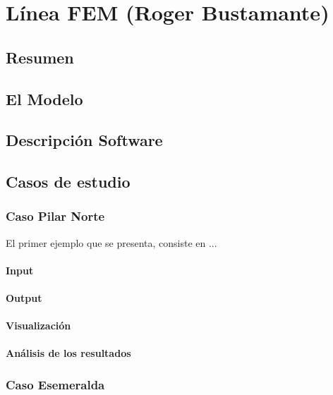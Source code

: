 
\chapter{L\'inea FEM (Roger Bustamante)}

\section{Resumen}

\section{El Modelo}

\section{Descripci\'on Software}


\section{Casos de estudio}

\subsection{Caso Pilar Norte}


El primer ejemplo que se presenta, consiste en ...


\subsubsection{Input}

\subsubsection{Output}

\subsubsection{Visualizaci\'on}

\subsubsection{An\'alisis de los resultados}

\subsection{Caso Esemeralda}


